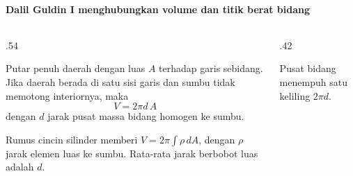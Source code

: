 \documentclass{../../kalkulus-ppt}
\begin{document}
\begin{frame}{\insertsection}
    \framesubtitle{Dalil Guldin I menghubungkan volume dan titik berat bidang}
    \begin{columns}[c,onlytextwidth]
        \begin{column}{.54\textwidth}
            \begin{teorema}
                Putar penuh daerah dengan luas $A$ terhadap garis sebidang.
                Jika daerah berada di satu sisi garis dan sumbu tidak
                memotong interiornya, maka
                \[
                    V=2\pi d\,A
                \]
                dengan $d$ jarak pusat massa bidang homogen ke sumbu.
            \end{teorema}
            Rumus cincin silinder memberi $V=2\pi\int \rho\,dA$,
            dengan $\rho$ jarak elemen luas ke sumbu. Rata-rata
            jarak berbobot luas adalah $d$.
        \end{column}
        \begin{column}{.42\textwidth}
            \centering
            \par
            \small Pusat bidang menempuh satu keliling $2\pi d$.
        \end{column}
    \end{columns}
\end{frame}
\end{document}
